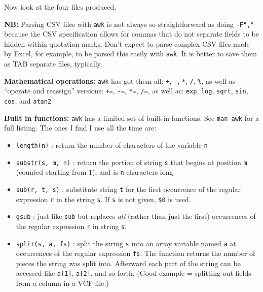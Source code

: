 \documentclass[]{krantz}
\makeatletter
\newenvironment{Shaded}{\begin{snugshade}}{\end{snugshade}}
\newcommand{\FunctionTok}[1]{\textcolor[rgb]{0,0,0}{#1}}
\newcommand{\NormalTok}[1]{#1}
\newcommand{\StringTok}[1]{\textcolor[rgb]{0.5,0.5,0.5}{#1}}
\providecommand{\tightlist}{%
  \setlength{\itemsep}{0pt}\setlength{\parskip}{0pt}}
\newenvironment{kframe}{%
\medskip{}
\setlength{\fboxsep}{.8em}
 \def\at@end@of@kframe{}%
 \ifinner\ifhmode%
  \def\at@end@of@kframe{\end{minipage}}%
  \begin{minipage}{\columnwidth}%
 \fi\fi%
 \def\FrameCommand##1{\hskip\@totalleftmargin \hskip-\fboxsep
 \colorbox{shadecolor}{##1}\hskip-\fboxsep
     \hskip-\linewidth \hskip-\@totalleftmargin \hskip\columnwidth}%
 \MakeFramed {\advance\hsize-\width
   \@totalleftmargin\z@ \linewidth\hsize
   \@setminipage}}%
 {\par\unskip\endMakeFramed%
 \at@end@of@kframe}
\renewenvironment{Shaded}{\begin{kframe}}{\end{kframe}}
\makeatother
\begin{document}
\begin{Shaded}
\end{Shaded}

Now look at the four files produced.

\textbf{NB:} Parsing CSV files with \texttt{awk} is not always so straightforward as doing \texttt{-F","} because
the CSV specification allows for commas that do not separate fields to be hidden within quotation marks.
Don't expect to parse complex CSV files made by Excel, for example, to be parsed this easily
with \texttt{awk}. It is better to save them as TAB separate files, typically.

\textbf{Mathematical operations:} \texttt{awk} has got them all: \texttt{+}, \texttt{-}, \texttt{*}, \texttt{/}, \texttt{\%}, as well as ``operate and reassign''
versions: \texttt{+=}, \texttt{-=}, \texttt{*=}, \texttt{/=}, as well as: \texttt{exp}, \texttt{log}, \texttt{sqrt}, \texttt{sin}, \texttt{cos}, and \texttt{atan2}

\textbf{Built in functions:} \texttt{awk} has a limited set of built-in functions. See \texttt{man\ awk} for a full
listing. The ones I find I use all the time are:

\begin{itemize}
\tightlist
\item
  \texttt{length(n)} : return the number of characters of the variable \texttt{n}
\item
  \texttt{substr(s,\ m,\ n)} : return the portion of string \texttt{s} that begins at position \texttt{m}
  (counted starting from 1), and is \texttt{n} characters long
\item
  \texttt{sub(r,\ t,\ s)} : substitute string \texttt{t} for the first occurrence of the regular expression \texttt{r} in the string \texttt{s}. If \texttt{s} is not given, \texttt{\$0} is used.
\item
  \texttt{gsub} : just like \texttt{sub} but replaces \emph{all} (rather than just the first) occurrences of the regular expression \texttt{r} in string \texttt{s}.
\item
  \texttt{split(s,\ a,\ fs)} : split the string \texttt{s} into an array variable named \texttt{a} at occurrences of the regular expression \texttt{fs}.
  The function returns the number of pieces the string was split into. Afterward each part of the string can be accessed like
  \texttt{a{[}1{]}}, \texttt{a{[}2{]}}, and so forth. (Good example = splitting out fields from a column in a VCF file.)
\end{itemize}
\end{document}
